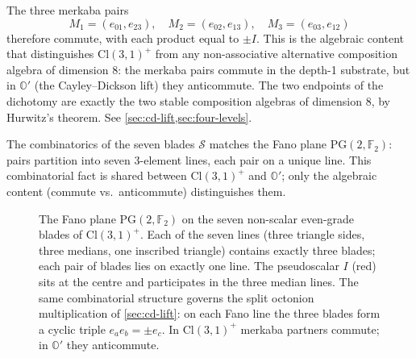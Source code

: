 \documentclass[11pt,a4paper]{article}
\theoremstyle{plain}
\theoremstyle{definition}
\theoremstyle{remark}
\numberwithin{equation}{section}
\providecommand{\Cl}{\mathrm{Cl}}
\providecommand{\R}{\mathbb{R}}
\providecommand{\F}{\mathbb{F}}
\providecommand{\Os}{\mathbb{O}'}
\providecommand{\PG}{\mathrm{PG}}
\providecommand{\eb}[1]{e_{#1}}
\begin{document}
The three merkaba pairs
\[
  M_1 = (\eb{01}, \eb{23}), \quad
  M_2 = (\eb{02}, \eb{13}), \quad
  M_3 = (\eb{03}, \eb{12})
\]
therefore commute, with each product equal to $\pm I$.  This is
the algebraic content that distinguishes $\Cl(3,1)^+$ from any
non-associative alternative composition algebra of dimension $8$:
the merkaba pairs commute in the depth-1 substrate, but in $\Os$
(the Cayley--Dickson lift) they anticommute.  The two endpoints
of the dichotomy are exactly the two stable composition algebras
of dimension $8$, by Hurwitz's theorem.  See
\cref{sec:cd-lift,sec:four-levels}.

The combinatorics of the seven blades $\mathcal{S}$ matches the
Fano plane $\mathrm{PG}(2, \F_2)$: pairs partition into seven
$3$-element lines, each pair on a unique line.  This combinatorial
fact is shared between $\Cl(3,1)^+$ and $\Os$; only the algebraic
content (commute vs.\ anticommute) distinguishes them.

\begin{figure}[h]
\centering
{}
\caption{The Fano plane $\PG(2,\F_2)$ on the seven non-scalar
even-grade blades of $\Cl(3,1)^+$.  Each of the seven lines
(three triangle sides, three medians, one inscribed triangle)
contains exactly three blades; each pair of blades lies on exactly
one line.  The pseudoscalar $I$ (red) sits at the centre and
participates in the three median lines.  The same combinatorial
structure governs the split octonion multiplication of
\cref{sec:cd-lift}: on each Fano line the three blades form a
cyclic triple $\eb{a}\eb{b} = \pm\eb{c}$.  In $\Cl(3,1)^+$
merkaba partners commute; in $\Os$ they anticommute.}
\label{fig:fano-plane}
\end{figure}
\end{document}
